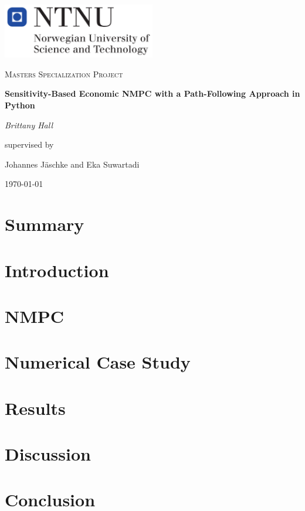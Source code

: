 \documentclass[12pt,a4paper]{report}
\begin{document}
\begin{titlepage}
	\centering
	\includegraphics[width=0.5\textwidth]{NTNU}\par\vspace{1cm}
	\vspace{1cm}
	{\scshape\Large Masters Specialization Project\par}
	\vspace{1.5cm}
	{\huge\bfseries Sensitivity-Based Economic NMPC with a Path-Following Approach in Python\par}
	\vspace{2cm}
	{\Large\itshape Brittany Hall\par}
	\vfill
	supervised by\par
	Johannes J{\"a}schke and Eka Suwartadi

	\vfill

	{\large \today\par}
\end{titlepage}
%
\tableofcontents
%
\chapter{Summary}
%
\chapter{Introduction}

\label{ch:intro}

%
\chapter{NMPC}

%
\chapter{Numerical Case Study}
%
\chapter{Results}
%
\chapter{Discussion}
%
\chapter{Conclusion}
%
\printbibliography
\end{document}
